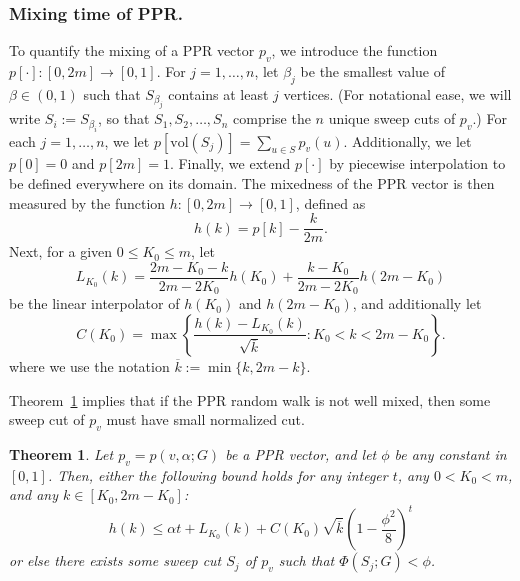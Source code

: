 \documentclass[11pt,twoside]{article}
\newtheorem{theorem}{Theorem}
\newcommand{\set}[1]{\left\{#1\right\}}
\newcommand{\vol}{\mathrm{vol}}
\newcommand{\1}{\mathbf{1}}
\begin{document}
\subsubsection{Mixing time of PPR.}

To quantify the mixing of a PPR vector $p_v$, we introduce the function $p[\cdot]: [0,2m] \to [0,1]$. For $j = 1,\ldots,n$, let $\beta_j$ be the smallest value of $\beta \in (0,1)$ such that $S_{\beta_j}$ contains at least $j$ vertices. (For notational ease, we will write $S_{i} := S_{\beta_i}$, so that $S_1,S_2,\ldots,S_n$ comprise the $n$ unique sweep cuts of $p_v$.)
For each $j = 1,\ldots,n$, we let $p[\vol(S_j)] =  \sum_{u \in S} p_v(u)$. Additionally, we let $p[0] = 0$ and $p[2m] = 1$. Finally, we extend $p[\cdot]$  by piecewise interpolation to be defined everywhere on its domain. The mixedness of the PPR vector is then measured by the function $h:[0,2m] \to [0,1]$, defined as 
\begin{equation*}
h(k) = p[k] - \frac{k}{2m}.
\end{equation*}
Next, for a given $0 \leq K_0 \leq m$, let 
\begin{equation*}
L_{K_0}(k) = \frac{2m - K_0 - k}{2m - 2K_0}h(K_0) + \frac{k - K_0}{2m - 2K_0}h(2m - K_0)
\end{equation*}
be the linear interpolator of $h(K_0)$ and $h(2m - K_0)$, and additionally let
\begin{equation*}
C(K_0) = \max\set{\frac{h(k) - L_{K_0}(k)}{\sqrt{\overline{k}}}: K_0 < k < 2m - K_0}.
\end{equation*}
where we use the notation $\overline{k} := \min\{k, 2m - k\}$.

Theorem~\ref{thm:mixing_time_PPR} implies that if the PPR random walk is not well mixed, then some sweep cut of $p_v$ must have small normalized cut.
\begin{theorem}
	\label{thm:mixing_time_PPR}
	Let $p_v = p(v,\alpha;G)$ be a PPR vector, and let $\phi$ be any constant in $[0,1]$. Then, either the following bound holds for any integer $t$, any $0 < K_0 < m$, and any $k \in [K_0,2m - K_0]$:
	\begin{equation}
	\label{eqn:mixing_time_PPR}
	h(k) \leq \alpha t + L_{K_0}(k) + C(K_0)\sqrt{\overline{k}}\left(1 - \frac{\phi^2}{8}\right)^t
	\end{equation}
	or else there exists some sweep cut $S_j$ of $p_v$ such that $\Phi(S_j;G) < \phi$.
\end{theorem}
\end{document}
